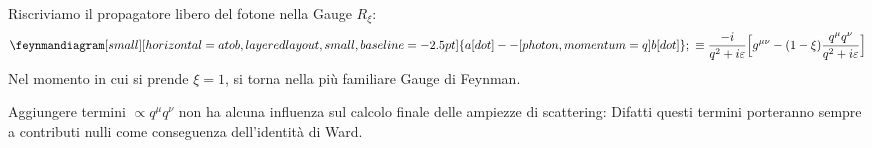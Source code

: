 \documentclass[../main.tex]{subfiles}
\begin{document}
Riscriviamo il propagatore libero del fotone nella Gauge $R_\xi$:
\begin{equation}
    \feynmandiagram[small][horizontal=a to b, layered layout, small, baseline=\plusheight] {
                                        a[dot]  -- [photon, momentum=q] b[dot]
                                        };
    ~ \equiv \frac{-i}{q^2 +i\varepsilon}\Bigl[g^{\mu\nu} - (1-\xi)\frac{q^\mu q^\nu}{q^2+i\varepsilon}\Bigr]
    \label{eq:R_xi_free_propagator}
\end{equation}
Nel momento in cui si prende $\xi=1$, si torna nella più familiare Gauge di Feynman.
\begin{nota}
    Aggiungere termini $\propto q^\mu q^\nu$ non ha alcuna influenza sul calcolo finale delle ampiezze di scattering: Difatti questi termini porteranno sempre a contributi nulli come conseguenza dell'identità di Ward.
    \label{note:terms_vanishing_for_wardID}
\end{nota}
\end{document}
